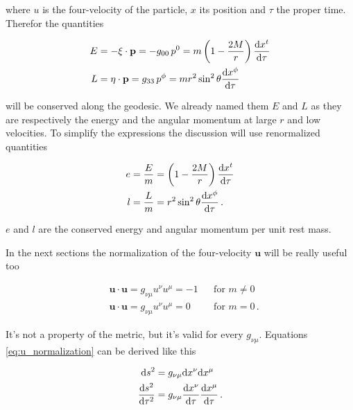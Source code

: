 where $u$ is the four-velocity of the particle, $x$ its position and $\tau$ the
proper time.
Therefor the quantities

\begin{align*}
    E &= - \mathbf{\xi \cdot p} =
    - g_{00} \, p^0 = m \left( 1 - \frac{2M}{r} \right) \dv{x^t}{\tau} \\
    L &= \mathbf{\eta \cdot p} =
    g_{33} \, p^\phi = m r^2 \sin^2 \theta \dv{x^\phi}{\tau}
\end{align*}

will be conserved along the geodesic.
We already named them $E$ and $L$ as they are respectively the energy and the
angular momentum at large $r$ and low velocities.
To simplify the expressions the discussion will use renormalized quantities

\begin{subequations}
    \begin{align}
        e &= \frac{E}{m} = \left( 1 - \frac{2M}{r} \right) \dv{x^t}{\tau}
        \label{eq:conserved_e} \\
        l &= \frac{L}{m} = r^2 \sin^2 \theta \dv{x^\phi}{\tau} \, .
        \label{eq:conserved_l}
    \end{align}
\end{subequations}

$e$ and $l$ are the conserved energy and angular momentum per unit rest mass.

In the next sections the normalization of the four-velocity $\mathbf u$ will be
really useful too

\begin{subequations}
    \begin{align}
        &\mathbf{u \cdot u} = g_{\nu \mu} u^\nu u^\mu = -1 
        &&\text{for } m \neq 0 \label{eq:u_normalization_mass} \\
        &\mathbf{u \cdot u} = g_{\nu \mu} u^\nu u^\mu = 0 
        &&\text{for } m = 0 \label{eq:u_normalization_light} \, .
    \end{align}
    \label{eq:u_normalization}
\end{subequations}

It's not a property of the metric, but it's valid for every $g_{\nu \mu}$.
Equations \ref{eq:u_normalization} can be derived like this

\begin{align*}
    \mathrm{d}s^2 &= g_{\nu \mu} \mathrm{d}x^\nu \mathrm{d}x^\mu \\
    \dv{s^2}{\tau^2} &= g_{\nu \mu} \dv{x^\nu}{\tau} \dv{x^\mu}{\tau} \, .
\end{align*}

